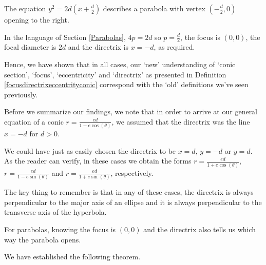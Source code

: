 \documentclass{ximera}
\begin{document}
  
 
The equation $y^2 = 2d\left(x + \frac{d}{2}\right)$ describes a parabola with vertex $\left(-\frac{d}{2}, 0\right)$ opening to the right.  

 

In the language of Section \ref{Parabolas}, $4p = 2d$ so $p = \frac{d}{2}$, the focus is $(0,0)$, the focal diameter is $2d$ and the directrix is $x = -d$, as required. 

 

 Hence, we have shown that in all cases, our `new' understanding  of `conic section', `focus', `eccentricity' and `directrix' as presented in Definition \ref{focusdirectrixeccentrityconic} correspond with the `old' definitions we've seen previously.
 
 

Before we summarize our findings, we note that in order to arrive at our general equation of a conic $r = \frac{ed}{1-e\cos(\theta)}$, we assumed that the directrix was the line $x = -d$ for $d > 0$. 

 

 We could have just as easily chosen the directrix to be $x = d$, $y = -d$ or $y = d$.  As the reader can verify, in these cases we obtain the forms  $r = \frac{ed}{1+e\cos(\theta)}$,  $r = \frac{ed}{1-e\sin(\theta)}$ and  $r = \frac{ed}{1+e\sin(\theta)}$, respectively. 
 
  
 
 The key thing to remember is that in any of these cases, the directrix is always perpendicular to the major axis of an ellipse and it is always perpendicular to the transverse axis of the hyperbola.
 
  
 
  For parabolas, knowing the focus is $(0,0)$ and the directrix also tells us which way the parabola opens.  
 
  
 
 We have established the following theorem.

 

\end{document}
